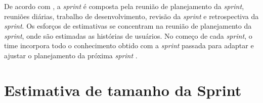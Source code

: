  De acordo com , a 
 \textit{sprint} é composta pela reunião de planejamento da \textit{sprint}, reuniões diárias, trabalho de desenvolvimento,
 revisão da \textit{sprint} e retrospectiva da \textit{sprint}. Os esforços de estimativas se concentram na reunião de
 planejamento da \textit{sprint}, onde são estimadas as histórias de usuários. No começo de cada \textit{sprint}, o time 
 incorpora todo o conhecimento obtido com a \textit{sprint} passada para adaptar e ajustar o planejamento da próxima
 \textit{sprint} \cite{cohn06}.
  
 \section{Estimativa de tamanho da Sprint}